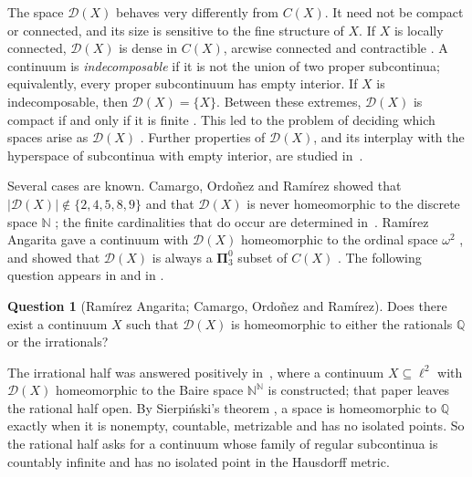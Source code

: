 \documentclass[11pt,reqno]{amsart}
\theoremstyle{plain}
\theoremstyle{definition}
\newtheorem{question}[theorem]{Question}
\theoremstyle{remark}
\newcommand{\D}{\mathcal{D}}
\newcommand{\N}{\mathbb{N}}
\newcommand{\Q}{\mathbb{Q}}
\begin{document}
The space $\D(X)$ behaves very differently from $C(X)$. It need not be compact or connected, and its size is sensitive to the fine structure of $X$. If $X$ is locally connected, $\D(X)$ is dense in $C(X)$, arcwise connected and contractible \cite[Theorem~3.6]{Ord18}. A continuum is \emph{indecomposable} if it is not the union of two proper subcontinua; equivalently, every proper subcontinuum has empty interior. If $X$ is indecomposable, then $\D(X)=\{X\}$. Between these extremes, $\D(X)$ is compact if and only if it is finite \cite[Corollary~4.13]{Ord18}. This led to the problem of deciding which spaces arise as $\D(X)$ \cite[Problem~3.22]{CORa}. Further properties of $\D(X)$, and its interplay with the hyperspace of subcontinua with empty interior, are studied in~\cite{Ord21,CORa}.

Several cases are known. Camargo, Ordo\~nez and Ram\'irez showed that $|\D(X)|\notin\{2,4,5,8,9\}$ \cite[Proposition~3.18]{CORa} and that $\D(X)$ is never homeomorphic to the discrete space $\N$ \cite[Theorem~3.25]{CORa}; the finite cardinalities that do occur are determined in~\cite{AdAfin}. Ram\'irez Angarita gave a continuum with $\D(X)$ homeomorphic to the ordinal space $\omega^2$ \cite[Ejemplo~3.2.1]{Ram23}, and showed that $\D(X)$ is always a $\boldsymbol{\Pi}^0_3$ subset of $C(X)$ \cite[Teorema~2.0.2]{Ram23}. The following question appears in \cite[Pregunta~3.2.14]{Ram23} and in \cite[Question~3.26]{CORa}.

\begin{question}[Ram\'irez Angarita; Camargo, Ordo\~nez and Ram\'irez]\label{Q:main}
Does there exist a continuum $X$ such that $\D(X)$ is homeomorphic to either the rationals $\Q$ or the irrationals?
\end{question}

The irrational half was answered positively in~\cite{AdAirr}, where a continuum $X\subseteq\ell^2$ with $\D(X)$ homeomorphic to the Baire space $\N^{\N}$ is constructed; that paper leaves the rational half open. By Sierpi\'nski's theorem \cite[Exercise~7.12]{Kechris}, a space is homeomorphic to $\Q$ exactly when it is nonempty, countable, metrizable and has no isolated points. So the rational half asks for a continuum whose family of regular subcontinua is countably infinite and has no isolated point in the Hausdorff metric.
\end{document}
